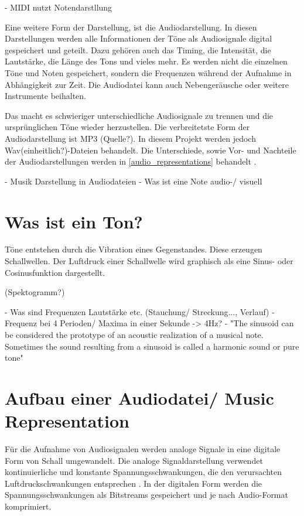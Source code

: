 \par

 - MIDI nutzt Notendarstllung

\par

Eine weitere Form der Darstellung, ist die Audiodarstellung. In diesen Darstellungen werden alle Informationen der Töne als Audiosignale digital gespeichert und geteilt. Dazu gehören auch das Timing, die Intensität, die Lautstärke, die Länge des Tons und vieles mehr. Es werden nicht die einzelnen Töne und Noten gespeichert, sondern die Frequenzen während der Aufnahme in Abhängigkeit zur Zeit. Die Audiodatei kann auch Nebengeräusche oder weitere Instrumente beihalten.

\par

Das macht es schwieriger unterschiedliche Audiosignale zu trennen und die ursprünglichen Töne wieder herzustellen. Die verbreitetste Form der Audiodarstellung ist MP3 (Quelle?). In diesem Projekt werden jedoch Wav(einheitlich?)-Dateien behandelt. Die Unterschiede, sowie Vor- und Nachteile der Audiodarstellungen werden in \cref{audio_representations} behandelt \parencite{fundamentals_of_music_processing}.

 - Musik Darstellung in Audiodateien
 - Was ist eine Note audio-/ visuell

%
\section{Was ist ein Ton?}
%

Töne entstehen durch die Vibration eines Gegenstandes. Diese erzeugen Schallwellen. Der Luftdruck einer Schallwelle wird graphisch als eine Sinus- oder Cosinusfunktion dargestellt.

%
(Spektogramm?)
%

 - Was sind Frequenzen Lautstärke etc. (Stauchung/ Streckung..., Verlauf)
 - Frequenz bei 4 Perioden/ Maxima in einer Sekunde -> 4Hz?
 - "The sinusoid can be considered the prototype of an acoustic realization of a musical note. Sometimes the sound resulting from a sinusoid is called a harmonic sound
or pure tone"

%
\section{Aufbau einer Audiodatei/ Music Representation}
%

Für die Aufnahme von Audiosignalen werden analoge Signale in eine digitale Form von Schall umgewandelt. Die analoge Signaldarstellung verwendet kontinuierliche und konstante Spannungsschwankungen, die den verursachten Luftdruckschwankungen entsprechen \parencite{digital_representation}. In der digitalen Form werden die Spannungsschwankungen als Bitstreams gespeichert und je nach Audio-Format komprimiert.

